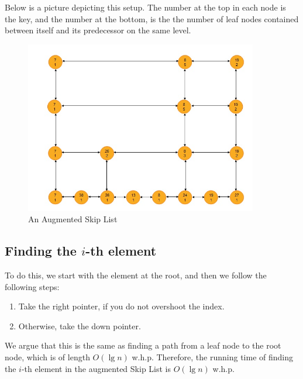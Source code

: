 \documentclass{article}
\begin{document}
Below is a picture depicting this setup. The number at the top in each
node is the key, and the number at the bottom, is the the number of
leaf nodes contained between itself and its predecessor on the same
level.

\begin{figure}[h!]
  \begin{center}
    \includegraphics[width=4in]{images/AugmentedSkipList.jpg}
    \caption{An Augmented Skip List}
    \label{fig:AugmentedSkipList}
  \end{center}
\end {figure}


\subsection{Finding the $i$-th element}

To do this, we start with the element at the root, and then we follow
the following steps:
\begin{enumerate}
\item Take the right pointer, if you do not overshoot the index.
\item Otherwise, take the down pointer.
\end{enumerate}

We argue that this is the same as finding a path from a leaf node to
the root node, which is of length $O(\lg{n})$ w.h.p. Therefore, the
running time of finding the $i$-th element in the augmented Skip List
is $O(\lg{n})$ w.h.p.
\end{document}
